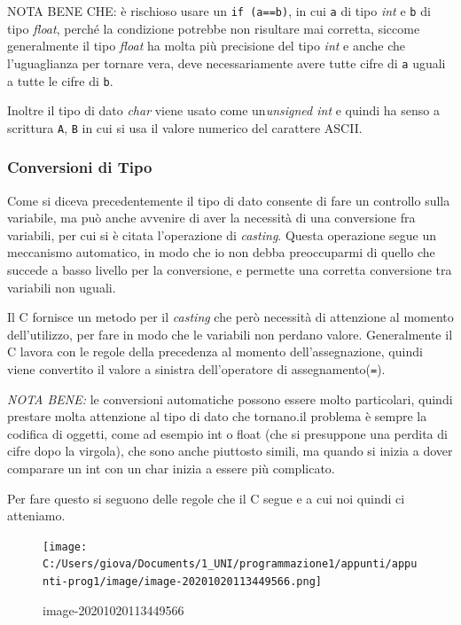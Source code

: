 \documentclass[
  paper=a4,
  oneside  ,captions=tableheading
]{scrbook}
\newcommand{\passthrough}[1]{#1}
\begin{document}
NOTA BENE CHE: è rischioso usare un \passthrough{\lstinline!if (a==b)!},
in cui \passthrough{\lstinline!a!} di tipo \emph{int} e
\passthrough{\lstinline!b!} di tipo \emph{float}, perché la condizione
potrebbe non risultare mai corretta, siccome generalmente il tipo
\emph{float} ha molta più precisione del tipo \emph{int} e anche che
l'uguaglianza per tornare vera, deve necessariamente avere tutte cifre
di \passthrough{\lstinline!a!} uguali a tutte le cifre di
\passthrough{\lstinline!b!}.

Inoltre il tipo di dato \emph{char} viene usato come un\emph{unsigned
int} e quindi ha senso a scrittura \passthrough{\lstinline!A!},
\passthrough{\lstinline!B!} in cui si usa il valore numerico del
carattere ASCII.

\hypertarget{conversioni-di-tipo}{%
\subsubsection{Conversioni di Tipo}\label{conversioni-di-tipo}}

Come si diceva precedentemente il tipo di dato consente di fare un
controllo sulla variabile, ma può anche avvenire di aver la necessità di
una conversione fra variabili, per cui si è citata l'operazione di
\emph{casting}. Questa operazione segue un meccanismo automatico, in
modo che io non debba preoccuparmi di quello che succede a basso livello
per la conversione, e permette una corretta conversione tra variabili
non uguali.

Il C fornisce un metodo per il \emph{casting} che però necessità di
attenzione al momento dell'utilizzo, per fare in modo che le variabili
non perdano valore. Generalmente il C lavora con le regole della
precedenza al momento dell'assegnazione, quindi viene convertito il
valore a sinistra dell'operatore di
assegnamento(\passthrough{\lstinline!=!}).

\emph{NOTA BENE:} le conversioni automatiche possono essere molto
particolari, quindi prestare molta attenzione al tipo di dato che
tornano.il problema è sempre la codifica di oggetti, come ad esempio int
o float (che si presuppone una perdita di cifre dopo la virgola), che
sono anche piuttosto simili, ma quando si inizia a dover comparare un
int con un char inizia a essere più complicato.

Per fare questo si seguono delle regole che il C segue e a cui noi
quindi ci atteniamo.

\begin{figure}
\centering
\texttt{[image: C:/Users/giova/Documents/1\_UNI/programmazione1/appunti/appunti-prog1/image/image-20201020113449566.png]}
\caption{image-20201020113449566}
\end{figure}
\end{document}

